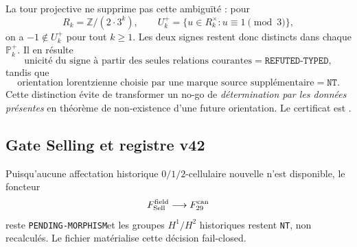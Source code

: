 \documentclass[11pt,a4paper]{article}
\newcommand{\certPending}{\texttt{PENDING-MORPHISM}}
\newcommand{\certNT}{\texttt{NT}}
\begin{document}
La tour projective ne supprime pas cette ambiguïté : pour
\[
 R_k=\mathbb Z/(2\cdot3^k),
 \qquad
 U_k^+=\{u\in R_k^\times:u\equiv1\pmod3\},
\]
on a $-1\notin U_k^+$ pour tout $k\ge1$. Les deux signes restent donc distincts dans chaque $\mathbb P_k^+$. Il en résulte
\[
 \boxed{
 \text{unicité du signe à partir des seules relations courantes}
 =\texttt{REFUTED-TYPED},}
\]
tandis que
\[
 \boxed{
 \text{orientation lorentzienne choisie par une marque source supplémentaire}
 =\certNT.}
\]
Cette distinction évite de transformer un no-go de \emph{détermination par les données présentes} en théorème de non-existence d'une future orientation. Le certificat est .

\subsection{Gate Selling et registre v42}

Puisqu'aucune affectation historique $0/1/2$-cellulaire nouvelle n'est disponible, le foncteur
\[
 F_{\rm Sell}^{\rm field}\longrightarrow F_{29}^{\rm can}
\]
reste \certPending et les groupes $H^1/H^2$ historiques restent \certNT, non recalculés. Le fichier  matérialise cette décision fail-closed.
\end{document}
